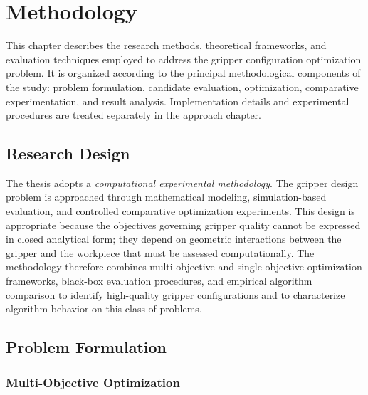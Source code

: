 \chapter{Methodology}
\label{chap:methodology}

This chapter describes the research methods, theoretical frameworks, and evaluation techniques employed to address the gripper configuration
optimization problem. It is organized according to the principal methodological components of the study: problem formulation, candidate evaluation,
optimization, comparative experimentation, and result analysis. Implementation details and experimental procedures are treated separately in the
approach chapter.

\section{Research Design}

The thesis adopts a \emph{computational experimental methodology}. The gripper design problem is approached through mathematical modeling,
simulation-based evaluation, and controlled comparative optimization experiments. This design is appropriate because the objectives governing gripper
quality cannot be expressed in closed analytical form; they depend on geometric interactions between the gripper and the workpiece that must be
assessed computationally. The methodology therefore combines multi-objective and single-objective optimization frameworks, black-box evaluation
procedures, and empirical algorithm comparison to identify high-quality gripper configurations and to characterize algorithm behavior on this class of
problems.

\section{Problem Formulation}
\label{sec:methodology_problem_formulation}

\subsection{Multi-Objective Optimization}
\label{subsec:methodology_moo}

